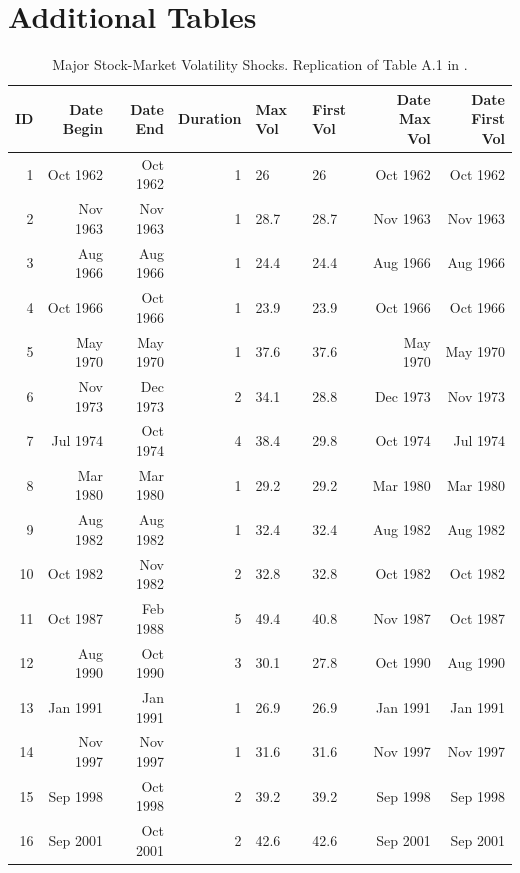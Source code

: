 \documentclass[a4paper,11pt,listof=nochaptergap,oneside,pointednumbers,bibtotoc,bigheadings,liststotoc]{scrbook}
\theoremstyle{mysatz}
\theoremstyle{mydefinition}
\theoremstyle{mytheorem}
\theoremstyle{mybemerkung}
\begin{document}
\section{Additional Tables}
\label{sec:additionalTables}


\begin{spacing}{.9}
\begin{landscape}
\centering
    \begin{longtable}{rrrrllrr}
    \caption[Major Stock-Market Volatility Shocks following \citet{bloom:09}.]{Major Stock-Market Volatility Shocks. Replication of Table A.1 in \citet{bloom:09}.} \\
    \toprule
         ID & Date Begin & Date End & Duration & Max Vol & First Vol & Date Max Vol & Date First Vol \\ \midrule
         1 & Oct 1962 & Oct 1962 & 1 & 26 & 26 & Oct 1962 & Oct 1962 \\
         2 & Nov 1963 & Nov 1963 & 1 & 28.7 & 28.7 & Nov 1963 & Nov 1963 \\
         3 & Aug 1966 & Aug 1966 & 1 & 24.4 & 24.4 & Aug 1966 & Aug 1966 \\
         4 & Oct 1966 & Oct 1966 & 1 & 23.9 & 23.9 & Oct 1966 & Oct 1966 \\
         5 & May 1970 & May 1970 & 1 & 37.6 & 37.6 & May 1970 & May 1970 \\
         6 & Nov 1973 & Dec 1973 & 2 & 34.1 & 28.8 & Dec 1973 & Nov 1973 \\
         7 & Jul 1974 & Oct 1974 & 4 & 38.4 & 29.8 & Oct 1974 & Jul 1974 \\
         8 & Mar 1980 & Mar 1980 & 1 & 29.2 & 29.2 & Mar 1980 & Mar 1980 \\
         9 & Aug 1982 & Aug 1982 & 1 & 32.4 & 32.4 & Aug 1982 & Aug 1982 \\
        10 & Oct 1982 & Nov 1982 & 2 & 32.8 & 32.8 & Oct 1982 & Oct 1982 \\
        11 & Oct 1987 & Feb 1988 & 5 & 49.4 & 40.8 & Nov 1987 & Oct 1987 \\
        12 & Aug 1990 & Oct 1990 & 3 & 30.1 & 27.8 & Oct 1990 & Aug 1990 \\
        13 & Jan 1991 & Jan 1991 & 1 & 26.9 & 26.9 & Jan 1991 & Jan 1991 \\
        14 & Nov 1997 & Nov 1997 & 1 & 31.6 & 31.6 & Nov 1997 & Nov 1997 \\
        15 & Sep 1998 & Oct 1998 & 2 & 39.2 & 39.2 & Sep 1998 & Sep 1998 \\
        16 & Sep 2001 & Oct 2001 & 2 & 42.6 & 42.6 & Sep 2001 & Sep 2001 \\

\end{longtable}
\end{landscape}
\end{spacing}
\end{document}
